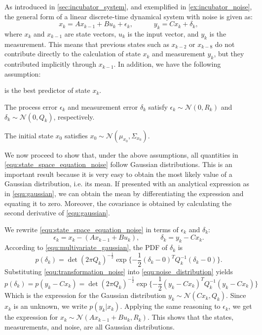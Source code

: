 As introduced in \cref{sec:incubator_system}, and exemplified in \cref{ex:incubator_noise}, the general form of a linear discrete-time dynamical system with noise is given as:
\begin{equation}\label{equ:state_space_equation_noise}
		{x}_k =Ax_{k-1}+Bu_k+\epsilon_k, \hspace{3em} 
    y_k =Cx_k+\delta_k,
\end{equation}
where $x_k$ and $x_{k-1}$ are state vectors, $u_k$ is the input vector, and $y_k$ is the measurement. 
This means that previous states such as $x_{k-2}$ or $x_{k-8}$ do not contribute directly to the calculation of state $x_k$ and measurement $y_k$, but they contributed implicitly through $x_{k-1}$. 
In addition, we have the following assumption:
\begin{compactitem}
\item {} is the best predictor of state $x_k$.
\item The process error $\epsilon_k$ and measurement error $\delta_k$ satisfy $\epsilon_k \sim \mathcal{N}(0,R_k)$ and $\delta_k \sim \mathcal{N}(0,Q_k)$, respectively.
\item The initial state $x_0$ satisfies $x_0 \sim \mathcal{N}(\mu_{x_0},\Sigma_{x_0})$.
\end{compactitem}

We now proceed to show that, under the above assumptions, all quantities in \cref{equ:state_space_equation_noise} follow Gaussian distributions.
This is an important result because it is very easy to obtain the most likely value of a Gaussian distribution, i.e. its mean.
If presented with an analytical expression as in \cref{equ:gaussian}, we can obtain the mean by differentiating the expression and equating it to zero.
Moreover, the covariance is obtained by calculating the second derivative of \cref{equ:gaussian}.

We rewrite \cref{equ:state_space_equation_noise} in terms of $\epsilon_k$ and $\delta_k$:
\begin{equation} \label{equ:transformation_noise}
		\epsilon_k  = {x}_k - (Ax_{k-1}+Bu_k), \hspace{3em}
		\delta_k = y_k - C x_k.
\end{equation}
According to \cref{equ:multivariate_gaussian}, the PDF of $\delta_k$ is
\begin{equation} \label{equ:noise_distribution}
	p(\delta_k) = \det (2\pi Q_k)^{-\frac{1}{2}}\exp\{ -\frac{1}{2}(\delta_k-0)^TQ_k^{-1}(\delta_k-0)\}.
\end{equation}
Substituting \cref{equ:transformation_noise} into \cref{equ:noise_distribution} yields
\begin{equation}
	p(\delta_k) = p(y_k - C x_k) 
	= \det (2\pi Q_k)^{-\frac{1}{2}}\exp\{ -\frac{1}{2}(y_k -Cx_k)^TQ_k^{-1}(y_k -Cx_k)\}
\end{equation}
Which is the expression for the Gaussian distribution $y_k \sim \mathcal{N}(Cx_k,Q_k)$.
Since $x_k$ is an unknown, we write $p(y_k | x_k)$.
Applying the same reasoning to $\epsilon_k$, we get the expression for $x_k \sim \mathcal{N}(Ax_{k-1}+Bu_k,R_k)$.
This shows that the states, measurements, and noise, are all Gaussian distributions.

